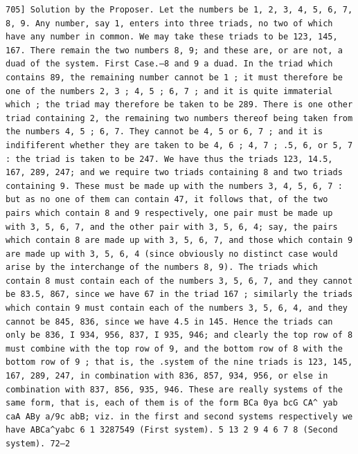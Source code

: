 \documentclass[11pt,a4paper]{book}
\begin{document}
\newpage
\setcounter{page}{571}
\begin{verbatim}
705] Solution by the Proposer. Let the numbers be 1, 2, 3, 4, 5, 6, 7, 8, 9. Any number, say 1, enters into three triads, no two of which have any number in common. We may take these triads to be 123, 145, 167. There remain the two numbers 8, 9; and these are, or are not, a duad of the system. First Case.—8 and 9 a duad. In the triad which contains 89, the remaining number cannot be 1 ; it must therefore be one of the numbers 2, 3 ; 4, 5 ; 6, 7 ; and it is quite immaterial which ; the triad may therefore be taken to be 289. There is one other triad containing 2, the remaining two numbers thereof being taken from the numbers 4, 5 ; 6, 7. They cannot be 4, 5 or 6, 7 ; and it is indififerent whether they are taken to be 4, 6 ; 4, 7 ; .5, 6, or 5, 7 : the triad is taken to be 247. We have thus the triads 123, 14.5, 167, 289, 247; and we require two triads containing 8 and two triads containing 9. These must be made up with the numbers 3, 4, 5, 6, 7 : but as no one of them can contain 47, it follows that, of the two pairs which contain 8 and 9 respectively, one pair must be made up with 3, 5, 6, 7, and the other pair with 3, 5, 6, 4; say, the pairs which contain 8 are made up with 3, 5, 6, 7, and those which contain 9 are made up with 3, 5, 6, 4 (since obviously no distinct case would arise by the interchange of the numbers 8, 9). The triads which contain 8 must contain each of the numbers 3, 5, 6, 7, and they cannot be 83.5, 867, since we have 67 in the triad 167 ; similarly the triads which contain 9 must contain each of the numbers 3, 5, 6, 4, and they cannot be 845, 836, since we have 4.5 in 145. Hence the triads can only be 836, I 934, 956, 837, I 935, 946; and clearly the top row of 8 must combine with the top row of 9, and the bottom row of 8 with the bottom row of 9 ; that is, the .system of the nine triads is 123, 145, 167, 289, 247, in combination with 836, 857, 934, 956, or else in combination with 837, 856, 935, 946. These are really systems of the same form, that is, each of them is of the form BCa 0ya bcG CA^ yab caA ABy a/9c abB; viz. in the first and second systems respectively we have ABCa^yabc 6 1 3287549 (First system). 5 13 2 9 4 6 7 8 (Second system). 72—2 
\end{verbatim}
\end{document}
